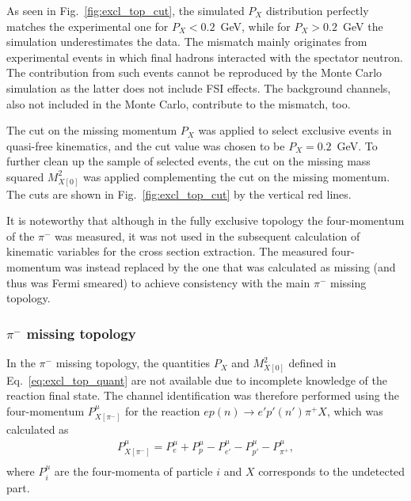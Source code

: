 \documentclass[prc,twocolumn,superscriptaddress,showpacs,amssymb,amsmath,amsfonts,aps,nofootinbib]{revtex4-1}
\begin{document}
As seen in Fig.\!~\ref{fig:excl_top_cut}, the simulated $P_{X}$ distribution perfectly matches the experimental one for $P_{X} < 0.2$~GeV, while for $P_{X} > 0.2$~GeV the simulation underestimates the data. The mismatch mainly originates from experimental events in which final hadrons interacted with the spectator neutron. The contribution from such events cannot be reproduced by the Monte Carlo simulation as the latter does not include FSI effects. The background channels, also not included in the Monte Carlo, contribute to the mismatch, too. %


The cut on the missing momentum $P_{X}$ was applied to select exclusive events in quasi-free kinematics, and the cut value was chosen to be $P_{X} = 0.2$~GeV. To further clean up the sample of selected events, the cut on the missing mass squared $M^{2}_{X[0]}$ was applied complementing the cut on the missing momentum. The cuts are shown in Fig.\!~\ref{fig:excl_top_cut} by the vertical red lines.


It is noteworthy that although in the fully exclusive topology the four-momentum of the $\pi^{-}$ was measured, it was not used in the subsequent calculation of kinematic variables for the cross section extraction. The measured four-momentum was instead replaced by the one that was calculated as missing (and thus was Fermi smeared) to achieve consistency with the main $\pi^{-}$ missing topology.

\subsubsection{$\pi^{-}$ missing topology}
\label{Sect:excl_cut_pim_miss}


In the $\pi^{-}$ missing topology, the quantities $P_{X}$ and $M^{2}_{X[0]}$ defined in Eq.\!~\eqref{eq:excl_top_quant} are not available due to incomplete knowledge of the reaction final state. The channel identification was therefore performed using the four-momentum $P_{X[\pi^{-}]}^{\mu}$ for the reaction $ep(n)\rightarrow e'p'(n')\pi^{+}X$, which was calculated as
\begin{equation}
\begin{aligned}
P_{X[\pi^{-}]}^{\mu}=P_{e}^{\mu} + P_{p}^{\mu}- P_{e'}^{\mu}- P_{p'}^{\mu}-  P_{\pi^{+}}^{\mu},\\[-2pt]
\end{aligned}\label{eq:pimmiss_top_quant}
\end{equation}
where $P_{i}^{\mu}$ are the four-momenta of particle $i$ and $X$ corresponds to the undetected part.
\end{document}

